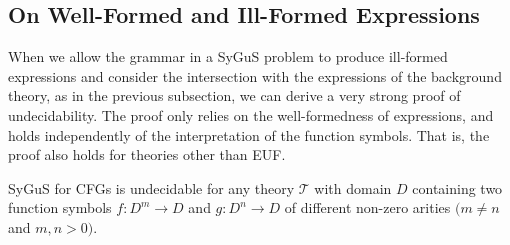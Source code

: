\subsection{On Well-Formed and Ill-Formed Expressions}

When we allow the grammar in a SyGuS problem to produce ill-formed expressions and consider the intersection with the expressions of the background theory, as in the previous subsection, we can derive a very strong proof of undecidability. 
The proof only relies on the well-formedness of expressions, and holds independently of the interpretation of the function symbols.
That is, the proof also holds for theories other than EUF. 



\begin{theorem}
SyGuS for CFGs is undecidable for any theory $\mathcal{T}$ with domain $D$ containing 
two function symbols $f:D^m\to D$ and $g:D^n\to D$ of different non-zero arities $(m\neq n$ and $m,n>0)$. 
\end{theorem}

